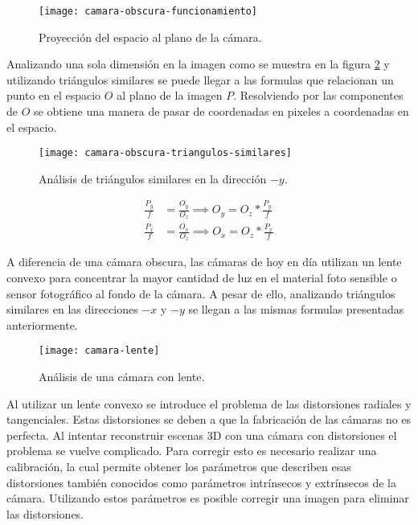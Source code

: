 \documentclass[]{article}
\begin{document}
\begin{figure}[H]
	\centering
	\texttt{[image: camara-obscura-funcionamiento]}
	\caption{Proyección del espacio al plano de la cámara.}
	\label{fig:camara-obscura-funcionamiento}
\end{figure}

Analizando una sola dimensión en la imagen como se muestra en la figura \ref{fig:camara-obscura-triangulos-similares} y utilizando triángulos similares se puede llegar a las formulas que relacionan un punto en el espacio $O$ al plano de la imagen $P$. Resolviendo por las componentes de $O$ se obtiene una manera de pasar de coordenadas en pixeles a coordenadas en el espacio.

\begin{figure}[H]
	\centering
	\texttt{[image: camara-obscura-triangulos-similares]}
	\caption{Análisis de triángulos similares en la dirección $-y$.}
	\label{fig:camara-obscura-triangulos-similares}
\end{figure}

\begin{align}
	\label{relacion_2d_3d}
	\frac{P_y}{f} &= \frac{O_y}{O_z} \implies {O_y} = {O_z} * \frac{P_y}{f} \\
	\frac{P_x}{f} &= \frac{O_x}{O_z} \implies {O_x} = {O_z} * \frac{P_x}{f}
\end{align}

A diferencia de una cámara obscura, las cámaras de hoy en día utilizan un lente convexo para concentrar la mayor cantidad de luz en el material foto sensible o sensor fotográfico al fondo de la cámara. A pesar de ello, analizando triángulos similares en las direcciones $-x$ y $-y$ se llegan a las mismas formulas presentadas anteriormente.

\begin{figure}[H]
	\centering
	\texttt{[image: camara-lente]}
	\caption{Análisis de una cámara con lente.}
	\label{fig:camara-lente}
\end{figure}

Al utilizar un lente convexo se introduce el problema de las distorsiones radiales y tangenciales. Estas distorsiones se deben a que la fabricación de las cámaras no es perfecta. Al intentar reconstruir escenas 3D con una cámara con distorsiones el problema se vuelve complicado. Para corregir esto es necesario realizar una calibración, la cual permite obtener los parámetros que describen esas distorsiones también conocidos como parámetros intrínsecos y extrínsecos de la cámara. Utilizando estos parámetros es posible corregir una imagen para eliminar las distorsiones.
\end{document}

